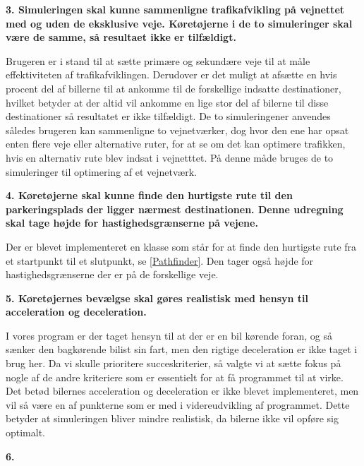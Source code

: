 \textbf{3. Simuleringen skal kunne sammenligne trafikafvikling på vejnettet med og uden de eksklusive veje. Køretøjerne i de to simuleringer skal være de samme, så resultaet ikke er tilfældigt.}

Brugeren er i stand til at sætte primære og sekundære veje til at måle effektiviteten af trafikafviklingen. Derudover er det muligt at afsætte en hvis procent del af billerne til at ankomme til de forskellige indsatte destinationer, hvilket betyder at der altid vil ankomme en lige stor del af bilerne til disse destinationer så resultatet er ikke tilfældigt. De to simuleringener anvendes således brugeren kan sammenligne to vejnetværker, dog hvor den ene har opsat enten flere veje eller alternative ruter, for at se om det kan optimere trafikken, hvis en alternativ rute blev indsat i vejnetttet. På denne måde bruges de to simuleringer til optimering af et vejnetværk.

\vspace{5mm}

\textbf{4. Køretøjerne skal kunne finde den hurtigste rute til den parkeringsplads der ligger nærmest destinationen. Denne udregning skal tage højde for hastighedsgrænserne på vejene.}

Der er blevet implementeret en klasse som står for at finde den hurtigste rute fra et startpunkt til et slutpunkt, se \ref{Pathfinder}. Den tager også højde for hastighedsgrænserne der er på de forskellige veje. 

\vspace{5mm}

\textbf{5. Køretøjernes bevælgse skal gøres realistisk med hensyn til acceleration og deceleration.}

I vores program er der taget hensyn til at der er en bil kørende foran, og så sænker den bagkørende bilist sin fart, men den rigtige deceleration er ikke taget i brug her. Da vi skulle prioritere succeskriterier, så valgte vi at sætte fokus på nogle af de andre kriteriere som er essentielt for at få programmet til at virke. Det betød bilernes acceleration og deceleration er ikke blevet implementeret, men vil så være en af punkterne som er med i videreudvikling af programmet. Dette betyder at simuleringen bliver mindre realistisk, da bilerne ikke vil opføre sig optimalt.

\vspace{5mm}

\textbf{6.}

